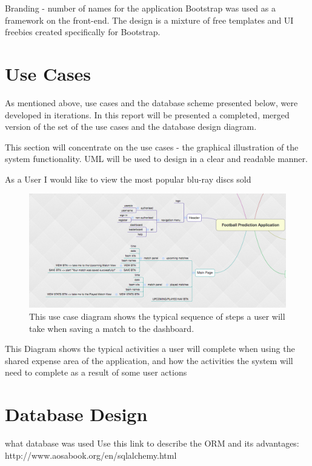 Branding - number of names for the application
Bootstrap was used as a framework on the front-end.
The design is a mixture of free templates and UI freebies created specifically for Bootstrap.

\section{Use Cases}
\label{usecases_prototype}
As mentioned above, use cases and the database scheme presented below, were developed in iterations. In this report will be presented a completed, merged version of the set of the use cases and the database design diagram. 

This section will concentrate on the use cases - the graphical illustration of the system functionality. UML will be used to design in a clear and readable manner. 

As a User I would like to view the most popular blu-ray discs sold



\begin{figure}[H]
	\begin{center}
		\includegraphics[width=.90\textwidth]{design/images/mindmap}
		\caption{This use case diagram shows the typical sequence of steps a user will take when saving a match to the dashboard.} \label{fig:using:usecase1}
	\end{center}
\end{figure}
This Diagram shows the typical activities a user will complete when using the shared expense area of the application, and how the activities the system will need to complete as a result of some user actions

\section{Database Design}
\label{databasedesign}
what database was used
Use this link to describe the ORM and its advantages: 
http://www.aosabook.org/en/sqlalchemy.html

